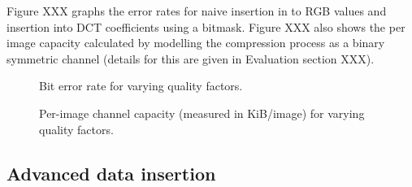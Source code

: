 Figure XXX graphs the error rates for naive insertion in to RGB values and insertion into DCT coefficients using a bitmask. Figure XXX also shows the per image capacity calculated by modelling the compression process as a binary symmetric channel (details for this are given in Evaluation section XXX).


\begin{figure}[tbph]
  \begin{center}
    \caption{Bit error rate for varying quality factors.}
    \label{graph:ber0}
  \end{center}
\end{figure}

\begin{figure}[tbph]
  \begin{center}
    \caption{Per-image channel capacity (measured in KiB/image) for varying quality factors.}
    \label{graph:capacity0}
  \end{center}
\end{figure}


\FloatBarrier
\subsection{Advanced data insertion}

